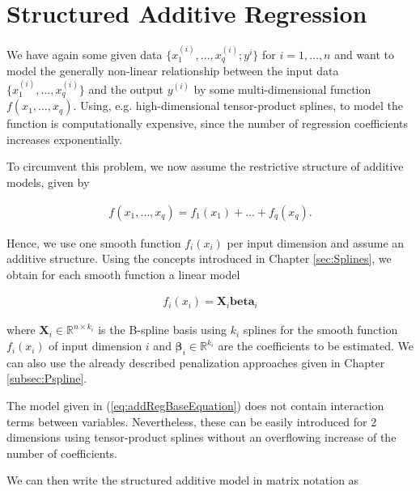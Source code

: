 \documentclass[10pt,a4paper]{article}
\begin{document}
\section{Structured Additive Regression} \label{sec:STAR}

We have again some given data $\{x^{(i)}_{1}, \dots, x^{(i)}_{q}; y^i\}$ for $i = 1, \dots, n$ and want to model the generally non-linear relationship between the input data $\{x^{(i)}_{1}, \dots, x^{(i)}_{q}\}$ and the output $y^{(i)}$ by some multi-dimensional function $f(x_1, \dots, x_q)$.  Using, e.g. high-dimensional tensor-product splines, to model the function is computationally expensive, since the number of regression coefficients increases exponentially.

To circumvent this problem, we now assume the restrictive structure of additive models, given by

\begin{align} \label{eq:addRegBaseEquation}
	f(x_1, \dots, x_q) = f_1(x_1) + \dots + f_q(x_q).
\end{align}

Hence, we use one smooth function $f_i(x_i)$ per input dimension and assume an additive structure. \cite{fahrmeir2013regression} Using the concepts introduced in Chapter \ref{sec:Splines}, we obtain for each smooth function a linear model

\begin{align}
	f_i(x_i) = \boldsymbol{X}_i \boldsymbol{beta}_i
\end{align}

where $\boldsymbol{X}_i \in \mathbb R^{n \times k_i}$ is the B-spline basis using $k_i$ splines for the smooth function $f_i(x_i)$ of input dimension $i$ and $\boldsymbol{\beta}_i \in \mathbb R^{k_i}$ are the coefficients to be estimated. We can also use the already described penalization approaches given in Chapter \ref{subsec:Pspline}. 

The model given in (\ref{eq:addRegBaseEquation}) does not contain interaction terms between variables. Nevertheless, these can be easily introduced for 2 dimensions using tensor-product splines without an overflowing increase of the number of coefficients.

We can then write the structured additive model in matrix notation as 
\end{document}
